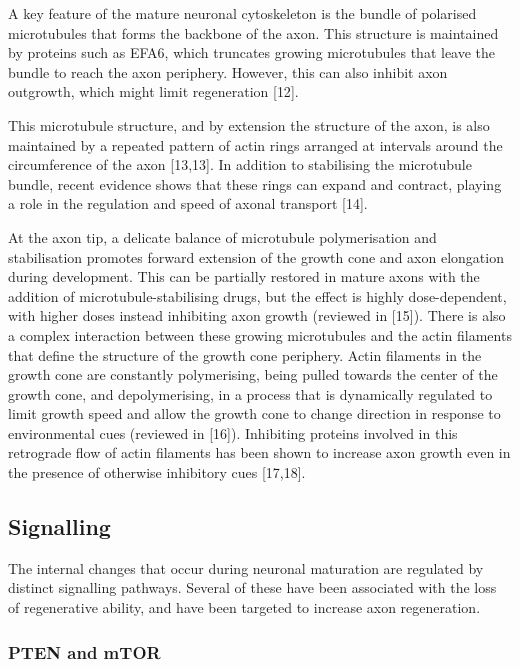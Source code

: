 \documentclass[
  12pt,
  a4paper,
]{book}
\begin{document}
A key feature of the mature neuronal cytoskeleton is the bundle of polarised microtubules that forms the backbone of the axon. This structure is maintained by proteins such as EFA6, which truncates growing microtubules that leave the bundle to reach the axon periphery. However, this can also inhibit axon outgrowth, which might limit regeneration {[}12{]}.

This microtubule structure, and by extension the structure of the axon, is also maintained by a repeated pattern of actin rings arranged at intervals around the circumference of the axon {[}13,13{]}. In addition to stabilising the microtubule bundle, recent evidence shows that these rings can expand and contract, playing a role in the regulation and speed of axonal transport {[}14{]}.

At the axon tip, a delicate balance of microtubule polymerisation and stabilisation promotes forward extension of the growth cone and axon elongation during development. This can be partially restored in mature axons with the addition of microtubule-stabilising drugs, but the effect is highly dose-dependent, with higher doses instead inhibiting axon growth (reviewed in {[}15{]}). There is also a complex interaction between these growing microtubules and the actin filaments that define the structure of the growth cone periphery. Actin filaments in the growth cone are constantly polymerising, being pulled towards the center of the growth cone, and depolymerising, in a process that is dynamically regulated to limit growth speed and allow the growth cone to change direction in response to environmental cues (reviewed in {[}16{]}). Inhibiting proteins involved in this retrograde flow of actin filaments has been shown to increase axon growth even in the presence of otherwise inhibitory cues {[}17,18{]}.

\hypertarget{signalling}{%
\subsection{Signalling}\label{signalling}}

The internal changes that occur during neuronal maturation are regulated by distinct signalling pathways. Several of these have been associated with the loss of regenerative ability, and have been targeted to increase axon regeneration.

\hypertarget{pten-and-mtor}{%
\subsubsection{PTEN and mTOR}\label{pten-and-mtor}}
\end{document}
